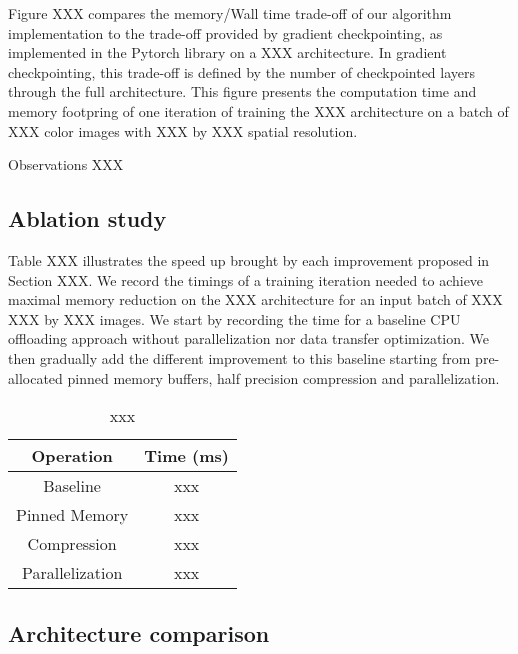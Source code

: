 \documentclass[11pt,onecolumn]{article}
\begin{document}
Figure XXX compares the memory/Wall time trade-off of our 
algorithm implementation to the trade-off provided by gradient checkpointing,
as implemented in the Pytorch \cite{} library on a XXX architecture.
In gradient checkpointing, this trade-off is defined by the
number of checkpointed layers through the full architecture.
This figure presents the computation time and memory footpring of one iteration of training
the XXX architecture on a batch of XXX color images with XXX by XXX spatial resolution.

Observations XXX

\subsection{Ablation study}

Table XXX illustrates the speed up brought by each improvement proposed in Section XXX.
We record the timings of a training iteration 
needed to achieve maximal memory reduction on the XXX architecture
for an input batch of XXX XXX by XXX images.
We start by recording the time for a baseline CPU 
offloading approach without parallelization 
nor data transfer optimization.
We then gradually add the different improvement to this baseline starting from 
pre-allocated pinned memory buffers, half precision compression and parallelization.

\begin{table*}[h]
\begin{center}
\begin{tabular}{ c c }	
\hline
Operation                  & Time (ms)  \\
\hline
Baseline                      &  xxx \\
Pinned Memory           &  xxx \\
Compression      	     &  xxx \\
Parallelization             &  xxx \\
\hline
\end{tabular}
\caption{xxx}
\end{center}
\end{table*}

\subsection{Architecture comparison}
\end{document}
